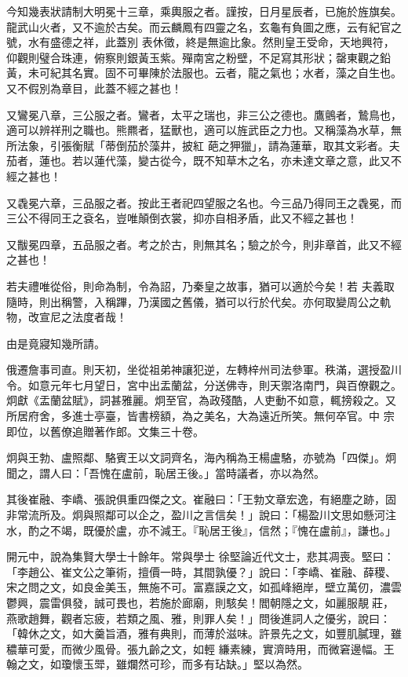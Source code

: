 \begin{pinyinscope}
 今知幾表狀請制大明冕十三章，乘輿服之者。謹按，日月星辰者，已施於旌旗矣。龍武山火者，又不逾於古矣。而云麟鳳有四靈之名，玄龜有負圖之應，云有紀官之號，水有盛德之祥，此蓋別
 表休徵，終是無逾比象。然則皇王受命，天地興符，仰觀則璧合珠連，俯察則銀黃玉紫。殫南宮之粉壁，不足寫其形狀；罄東觀之鉛黃，未可紀其名實。固不可畢陳於法服也。云者，龍之氣也；水者，藻之自生也。又不假別為章目，此蓋不經之甚也！



 又鸞冕八章，三公服之者。鸞者，太平之瑞也，非三公之德也。鷹鸇者，鷙鳥也，適可以辨祥刑之職也。熊羆者，猛獸也，適可以旌武臣之力也。又稱藻為水草，無所法象，引張衡賦「蒂倒茄於藻井，披紅
 葩之狎獵」，請為蓮華，取其文彩者。夫茄者，蓮也。若以蓮代藻，變古從今，既不知草木之名，亦未達文章之意，此又不經之甚也！



 又毳冕六章，三品服之者。按此王者祀四望服之名也。今三品乃得同王之毳冕，而三公不得同王之袞名，豈唯顛倒衣裳，抑亦自相矛盾，此又不經之甚也！



 又黻冕四章，五品服之者。考之於古，則無其名；驗之於今，則非章首，此又不經之甚也！



 若夫禮唯從俗，則命為制，令為詔，乃秦皇之故事，猶可以適於今矣！若
 夫義取隨時，則出稱警，入稱蹕，乃漢國之舊儀，猶可以行於代矣。亦何取變周公之軌物，改宣尼之法度者哉！



 由是竟寢知幾所請。



 俄遷詹事司直。則天初，坐從祖弟神讓犯逆，左轉梓州司法參軍。秩滿，選授盈川令。如意元年七月望日，宮中出盂蘭盆，分送佛寺，則天禦洛南門，與百僚觀之。炯獻《盂蘭盆賦》，詞甚雅麗。炯至官，為政殘酷，人吏動不如意，輒搒殺之。又所居府舍，多進士亭臺，皆書榜額，為之美名，大為遠近所笑。無何卒官。中
 宗即位，以舊僚追贈著作郎。文集三十卷。



 炯與王勃、盧照鄰、駱賓王以文詞齊名，海內稱為王楊盧駱，亦號為「四傑」。炯聞之，謂人曰：「吾愧在盧前，恥居王後。」當時議者，亦以為然。



 其後崔融、李嶠、張說俱重四傑之文。崔融曰：「王勃文章宏逸，有絕塵之跡，固非常流所及。炯與照鄰可以企之，盈川之言信矣！」說曰：「楊盈川文思如懸河注水，酌之不竭，既優於盧，亦不減王。『恥居王後』，信然；『愧在盧前』，謙也。」



 開元中，說為集賢大學士十餘年。常與學士
 徐堅論近代文士，悲其凋喪。堅曰：「李趙公、崔文公之筆術，擅價一時，其間孰優？」說曰：「李嶠、崔融、薛稷、宋之問之文，如良金美玉，無施不可。富嘉謨之文，如孤峰絕岸，壁立萬仞，濃雲鬱興，震雷俱發，誠可畏也，若施於廊廟，則駭矣！閻朝隱之文，如麗服靚莊，燕歌趙舞，觀者忘疲，若類之風、雅，則罪人矣！」問後進詞人之優劣，說曰：「韓休之文，如大羹旨酒，雅有典則，而薄於滋味。許景先之文，如豐肌膩理，雖穠華可愛，而微少風骨。張九齡之文，如輕
 縑素練，實濟時用，而微窘邊幅。王翰之文，如瓊懷玉斝，雖爛然可珍，而多有玷缺。」堅以為然。




\end{pinyinscope}

